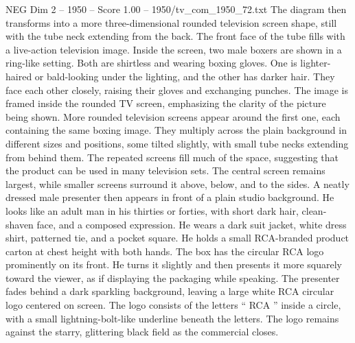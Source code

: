 \begin{textsample}{NEG Dim 2 – 1950 – Score 1.00 – 1950/tv\_com\_1950\_72.txt}
The diagram then transforms into a more three-dimensional rounded television screen shape, still with the tube neck extending from the back.
The front face of the tube fills with a live-action television image.
Inside the screen, two male boxers are shown in a ring-like setting.
Both are shirtless and wearing boxing gloves.
One is lighter-haired or bald-looking under the lighting, and the other has darker hair.
They face each other closely, raising their gloves and exchanging punches.
The image is framed inside the rounded TV screen, emphasizing the clarity of the picture being shown.
More rounded television screens appear around the first one, each containing the same boxing image.
They multiply across the plain background in different sizes and positions, some tilted slightly, with small tube necks extending from behind them.
The repeated screens fill much of the space, suggesting that the product can be used in many television sets.
The central screen remains largest, while smaller screens surround it above, below, and to the sides.
A neatly dressed male presenter then appears in front of a plain studio background.
He looks like an adult man in his thirties or forties, with short dark hair, clean-shaven face, and a composed expression.
He wears a dark suit jacket, white dress shirt, patterned tie, and a pocket square.
He holds a small RCA-branded product carton at chest height with both hands.
The box has the circular RCA logo prominently on its front.
He turns it slightly and then presents it more squarely toward the viewer, as if displaying the packaging while speaking.
The presenter fades behind a dark sparkling background, leaving a large white RCA circular logo centered on screen.
The logo consists of the letters “ RCA ” inside a circle, with a small lightning-bolt-like underline beneath the letters.
The logo remains against the starry, glittering black field as the commercial closes.

\end{textsample}
